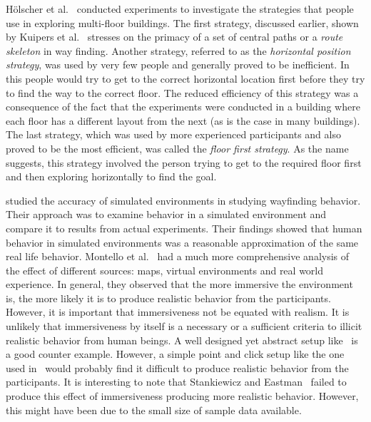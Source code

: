 H\"{o}lscher et al.~\cite{HolscherBMS06} conducted experiments to investigate the strategies that people use in exploring multi-floor buildings. The first strategy, discussed earlier, shown by Kuipers et al.~\cite{Kuipers01012003} stresses on the primacy of a set of central paths or a \emph{route skeleton} in way finding.  Another strategy, referred to as the \emph{horizontal position strategy}, was used by very few people and generally proved to be inefficient. In this people would try to get to the correct horizontal location first before they try to find the way to the correct floor. The reduced efficiency of this strategy was a consequence of the fact that the experiments were conducted in a building where each floor has a different layout from the next (as is the case in many buildings). The last strategy, which was used by more experienced participants and also proved to be the most efficient, was called the \emph{floor first strategy}. As the name suggests, this strategy involved the person trying to get to the required floor first and then exploring horizontally to find the goal.


\cite{O'Neill1992319} studied the accuracy of simulated environments in studying wayfinding behavior. Their approach was to examine behavior in a simulated environment and compare it to results from actual experiments. Their findings showed that human behavior in simulated environments was a reasonable approximation of the same real life behavior. Montello et al.~\cite{Montello:2004uj} had a much more comprehensive analysis of the effect of different sources: maps, virtual environments and real world experience. In general, they observed that the more immersive the environment is, the more likely it is to produce realistic behavior from the participants. However, it is important that immersiveness not be equated with realism. It is unlikely that immersiveness by itself is a necessary or a sufficient criteria to illicit realistic behavior from human beings. A well designed yet abstract setup like~\cite{O'Neill1992319} is a good counter example. However, a simple point and click setup like the one used in~\cite{Bode2013347} would probably find it difficult to produce realistic behavior from the participants. It is interesting to note that Stankiewicz and Eastman~\cite{StankiewiczEastman} failed to produce this effect of immersiveness producing more realistic behavior. However, this might have been due to the small size of sample data available.


